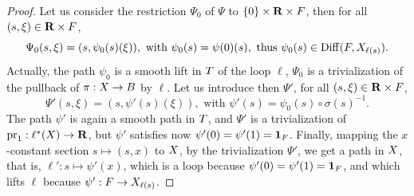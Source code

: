 \begin{proof}
  Let us consider the restriction $\Psi_0$ of $\Psi$ to $\{0\} \times {\mathbf R} \times F$,
  then for all $(s,\xi) \in {\mathbf R} \times F$,
  $$%
  \Psi_0(s,\xi) = (s,\psi_0(s)(\xi)), \text{ with } \psi_0(s) = \psi(0)(s), \text{ thus } \psi_0(s) \in \Diff(\F,\X_{\ell(s)}).
  $$%
  Actually,
  the path $\psi_0$ is a smooth lift in $T$ of the loop $\ell$,
  $\Psi_0$ is a trivialization of the pullback of $\pi : X \to B$ by $\ell$.
  Let us introduce then $\Psi'$,
  for all $(s,\xi) \in {\mathbf R} \times F$,
  $$%
  \Psi'(s,\xi) = (s, \psi'(s)(\xi)), \text{ with } \psi'(s) = \psi_0(s) \circ \sigma(s)^{-1}.
  $$%
  The path $\psi'$ is again a smooth path in $T$,
  and $\Psi'$ is a trivialization of $\mathrm{pr}_1 : \ell^*(X) \to {\mathbf R}$,
  but $\psi'$ satisfies now $\psi'(0) = \psi'(1) = {\bf 1}_F$.
  Finally,
  mapping the $x$-constant section $s \mapsto (s,x)$ to $X$,
  by the trivialization $\Psi'$,
  we get a path in $X$,
  that is,
  $\ell' : s \mapsto \psi'(x)$,
  which is a loop because $\psi'(0) = \psi'(1) = {\bf 1}_F$,
  and which lifts $\ell$ because $\psi' : F \to X_{\ell(s)}$.
  

\end{proof}
